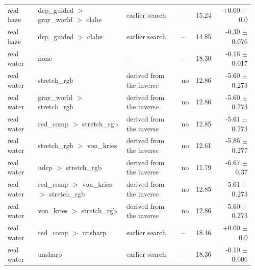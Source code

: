\begin{tabular}{llllrr}
real haze & dcp\_guided $>$ gray\_world $>$ clahe & earlier search & -- & 15.24 & +0.00 $\pm$ 0.0 \\
real haze & dcp\_guided $>$ clahe & earlier search & -- & 14.85 & -0.39 $\pm$ 0.076 \\
real water & none & -- & -- & 18.30 & -0.16 $\pm$ 0.017 \\
real water & stretch\_rgb & derived from the inverse & no & 12.86 & -5.60 $\pm$ 0.273 \\
real water & gray\_world $>$ stretch\_rgb & derived from the inverse & no & 12.86 & -5.60 $\pm$ 0.273 \\
real water & red\_comp $>$ stretch\_rgb & derived from the inverse & no & 12.85 & -5.61 $\pm$ 0.273 \\
real water & stretch\_rgb $>$ von\_kries & derived from the inverse & no & 12.61 & -5.86 $\pm$ 0.277 \\
real water & udcp $>$ stretch\_rgb & derived from the inverse & no & 11.79 & -6.67 $\pm$ 0.37 \\
real water & red\_comp $>$ von\_kries $>$ stretch\_rgb & derived from the inverse & no & 12.85 & -5.61 $\pm$ 0.273 \\
real water & von\_kries $>$ stretch\_rgb & derived from the inverse & no & 12.86 & -5.60 $\pm$ 0.273 \\
real water & red\_comp $>$ unsharp & earlier search & -- & 18.46 & +0.00 $\pm$ 0.0 \\
real water & unsharp & earlier search & -- & 18.36 & -0.10 $\pm$ 0.006 \\
\bottomrule
\end{tabular}
